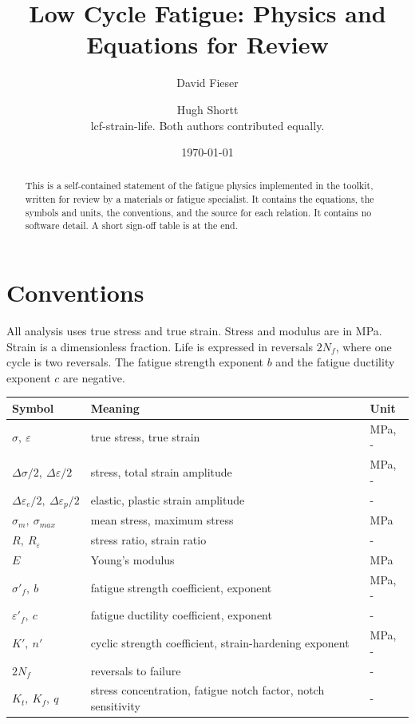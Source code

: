 \documentclass[11pt]{article}
\title{Low Cycle Fatigue: Physics and Equations for Review}
\author{David Fieser \and Hugh Shortt\\[2pt]
\small lcf-strain-life. Both authors contributed equally.}
\date{\today}
\begin{document}
\maketitle

\begin{abstract}
This is a self-contained statement of the fatigue physics implemented in the
toolkit, written for review by a materials or fatigue specialist. It contains the
equations, the symbols and units, the conventions, and the source for each
relation. It contains no software detail. A short sign-off table is at the end.
\end{abstract}

\section{Conventions}

All analysis uses true stress and true strain. Stress and modulus are in
\si{\mega\pascal}. Strain is a dimensionless fraction. Life is expressed in
reversals \(2N_f\), where one cycle is two reversals. The fatigue strength
exponent \(b\) and the fatigue ductility exponent \(c\) are negative.

\begin{table}[h]
\centering
\small
\begin{tabular}{lll}
\toprule
Symbol & Meaning & Unit \\
\midrule
\(\sigma,\ \varepsilon\) & true stress, true strain & \si{\mega\pascal}, - \\
\(\Delta\sigma/2,\ \Delta\varepsilon/2\) & stress, total strain amplitude & \si{\mega\pascal}, - \\
\(\Delta\varepsilon_e/2,\ \Delta\varepsilon_p/2\) & elastic, plastic strain amplitude & - \\
\(\sigma_m,\ \sigma_{max}\) & mean stress, maximum stress & \si{\mega\pascal} \\
\(R,\ R_\varepsilon\) & stress ratio, strain ratio & - \\
\(E\) & Young's modulus & \si{\mega\pascal} \\
\(\sigma'_f,\ b\) & fatigue strength coefficient, exponent & \si{\mega\pascal}, - \\
\(\varepsilon'_f,\ c\) & fatigue ductility coefficient, exponent & - \\
\(K',\ n'\) & cyclic strength coefficient, strain-hardening exponent & \si{\mega\pascal}, - \\
\(2N_f\) & reversals to failure & - \\
\(K_t,\ K_f,\ q\) & stress concentration, fatigue notch factor, notch sensitivity & - \\
\bottomrule
\end{tabular}
\end{table}
\end{document}
